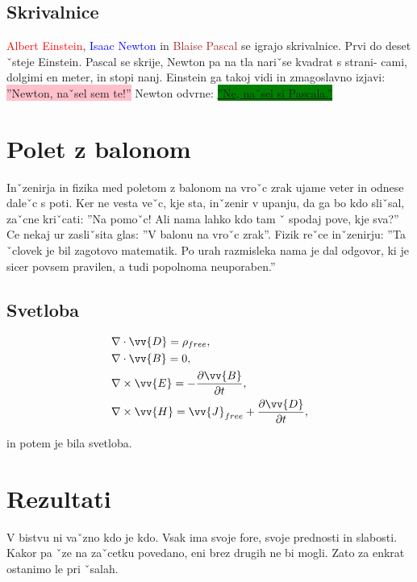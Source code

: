 \documentclass[12pt, a4paper]{article}
\begin{document}
\subsection{Skrivalnice}

\textcolor{red}{Albert Einstein}, \textcolor{blue}{Isaac Newton} in \textcolor{brown}{Blaise Pascal} se igrajo skrivalnice. Prvi do deset ˇsteje Einstein. Pascal se skrije, Newton pa na tla nariˇse kvadrat s strani- cami, dolgimi en meter, in stopi nanj. Einstein ga takoj vidi in zmagoslavno izjavi: \colorbox{pink}{”Newton, naˇsel sem te!”} Newton odvrne: \colorbox{green}{\underline{\underline{”Ne, naˇsel si Pascala.”}}}

\section{Polet z balonom}

\begin{framed}
Inˇzenirja in fizika med poletom z balonom na vroˇc zrak ujame veter in odnese daleˇc s poti. Ker ne vesta veˇc, kje sta, inˇzenir v upanju, da ga bo kdo sliˇsal, zaˇcne kriˇcati: ”Na pomoˇc! Ali nama lahko kdo tam
ˇ
spodaj pove, kje sva?” Ce nekaj ur zasliˇsita glas: ”V balonu na vroˇc
zrak”. Fizik reˇce inˇzenirju: ”Ta ˇclovek je bil zagotovo matematik. Po urah razmisleka nama je dal odgovor, ki je sicer povsem pravilen, a tudi popolnoma neuporaben.”
\end{framed}

\subsection{Svetloba}

\begin{align*}
&\nabla \cdot \vv{D} = \rho_{free}, \\
&\nabla \cdot \vv{B} = 0, \\
&\nabla \times \vv{E} = - \frac{\partial \vv{B}}{\partial t}, \\
&\nabla \times \vv{H} = \vv{J}_{free} + \frac{\partial \vv{D}}{\partial t},
\end{align*}
 
in potem je bila svetloba. \smiley{}

\section{Rezultati}

V bistvu ni vaˇzno kdo je kdo. Vsak ima svoje fore, svoje prednosti in slabosti. Kakor pa ˇze na zaˇcetku povedano, eni brez drugih ne bi mogli. Zato za enkrat ostanimo le pri ˇsalah.
\end{document}
